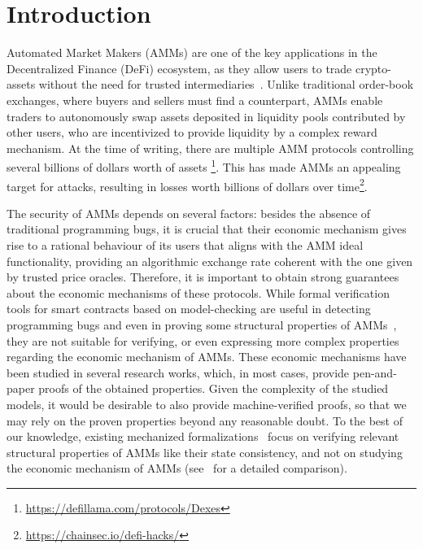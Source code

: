 \section{Introduction}
\label{sec:intro}

Automated Market Makers (AMMs) are one of the key applications in the Decentralized Finance (DeFi) ecosystem,
as they allow users to trade crypto-assets without the need for trusted intermediaries~\cite{Xu23csur}. 
Unlike traditional order-book exchanges, where buyers and sellers must find a counterpart, AMMs enable traders to autonomously swap assets deposited in liquidity pools contributed by other users, who are incentivized to provide liquidity by a complex reward mechanism. 
At the time of writing, there are multiple AMM protocols controlling several billions of dollars worth of assets%
\footnote{\url{https://defillama.com/protocols/Dexes}}. 
This has made AMMs an appealing target for attacks, resulting in losses worth billions of dollars over time\footnote{\url{https://chainsec.io/defi-hacks/}}.

The security of AMMs depends on several factors: besides the absence of traditional programming bugs, it is crucial that their economic mechanism gives rise to a rational behaviour of its users that aligns with the AMM ideal functionality, \ie providing an algorithmic exchange rate coherent with the one given by trusted price oracles. 
%
Therefore, it is important to obtain strong guarantees about the economic mechanisms of these protocols. 
While formal verification tools for smart contracts based on model-checking are useful in detecting programming bugs and even in proving some structural properties of AMMs~\cite{certora-compound-v2,certora-compound-v3}, they are not suitable for verifying, or even expressing more complex properties regarding the economic mechanism of AMMs.
These economic mechanisms have been studied in several research works, which, in most cases, provide pen-and-paper proofs of the obtained properties.
Given the complexity of the studied models, it would be desirable to also provide machine-verified proofs, so that we may rely on the proven properties beyond any reasonable doubt. 
To the best of our knowledge, existing mechanized formalizations~\cite{Nielsen23cpp} focus on verifying relevant structural properties of AMMs like their state consistency, and not on studying the economic mechanism of AMMs (see~ for a detailed comparison).

